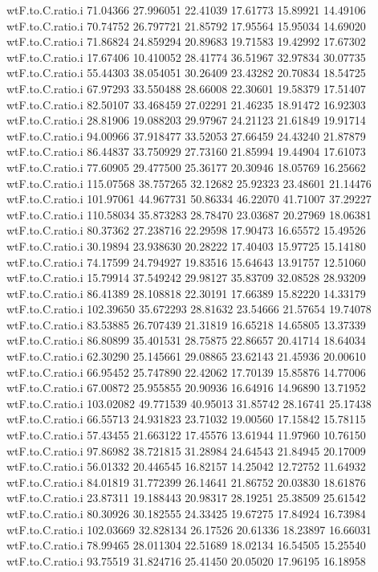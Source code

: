 \documentclass[11pt]{article} %
\begin{document}
\begin{Schunk}
\begin{Soutput}
wtF.to.C.ratio.i  71.04366 27.996051 22.41039 17.61773 15.89921 14.49106
wtF.to.C.ratio.i  70.74752 26.797721 21.85792 17.95564 15.95034 14.69020
wtF.to.C.ratio.i  71.86824 24.859294 20.89683 19.71583 19.42992 17.67302
wtF.to.C.ratio.i  17.67406 10.410052 28.41774 36.51967 32.97834 30.07735
wtF.to.C.ratio.i  55.44303 38.054051 30.26409 23.43282 20.70834 18.54725
wtF.to.C.ratio.i  67.97293 33.550488 28.66008 22.30601 19.58379 17.51407
wtF.to.C.ratio.i  82.50107 33.468459 27.02291 21.46235 18.91472 16.92303
wtF.to.C.ratio.i  28.81906 19.088203 29.97967 24.21123 21.61849 19.91714
wtF.to.C.ratio.i  94.00966 37.918477 33.52053 27.66459 24.43240 21.87879
wtF.to.C.ratio.i  86.44837 33.750929 27.73160 21.85994 19.44904 17.61073
wtF.to.C.ratio.i  77.60905 29.477500 25.36177 20.30946 18.05769 16.25662
wtF.to.C.ratio.i 115.07568 38.757265 32.12682 25.92323 23.48601 21.14476
wtF.to.C.ratio.i 101.97061 44.967731 50.86334 46.22070 41.71007 37.29227
wtF.to.C.ratio.i 110.58034 35.873283 28.78470 23.03687 20.27969 18.06381
wtF.to.C.ratio.i  80.37362 27.238716 22.29598 17.90473 16.65572 15.49526
wtF.to.C.ratio.i  30.19894 23.938630 20.28222 17.40403 15.97725 15.14180
wtF.to.C.ratio.i  74.17599 24.794927 19.83516 15.64643 13.91757 12.51060
wtF.to.C.ratio.i  15.79914 37.549242 29.98127 35.83709 32.08528 28.93209
wtF.to.C.ratio.i  86.41389 28.108818 22.30191 17.66389 15.82220 14.33179
wtF.to.C.ratio.i 102.39650 35.672293 28.81632 23.54666 21.57654 19.74078
wtF.to.C.ratio.i  83.53885 26.707439 21.31819 16.65218 14.65805 13.37339
wtF.to.C.ratio.i  86.80899 35.401531 28.75875 22.86657 20.41714 18.64034
wtF.to.C.ratio.i  62.30290 25.145661 29.08865 23.62143 21.45936 20.00610
wtF.to.C.ratio.i  66.95452 25.747890 22.42062 17.70139 15.85876 14.77006
wtF.to.C.ratio.i  67.00872 25.955855 20.90936 16.64916 14.96890 13.71952
wtF.to.C.ratio.i 103.02082 49.771539 40.95013 31.85742 28.16741 25.17438
wtF.to.C.ratio.i  66.55713 24.931823 23.71032 19.00560 17.15842 15.78115
wtF.to.C.ratio.i  57.43455 21.663122 17.45576 13.61944 11.97960 10.76150
wtF.to.C.ratio.i  97.86982 38.721815 31.28984 24.64543 21.84945 20.17009
wtF.to.C.ratio.i  56.01332 20.446545 16.82157 14.25042 12.72752 11.64932
wtF.to.C.ratio.i  84.01819 31.772399 26.14641 21.86752 20.03830 18.61876
wtF.to.C.ratio.i  23.87311 19.188443 20.98317 28.19251 25.38509 25.61542
wtF.to.C.ratio.i  80.30926 30.182555 24.33425 19.67275 17.84924 16.73984
wtF.to.C.ratio.i 102.03669 32.828134 26.17526 20.61336 18.23897 16.66031
wtF.to.C.ratio.i  78.99465 28.011304 22.51689 18.02134 16.54505 15.25540
wtF.to.C.ratio.i  93.75519 31.824716 25.41450 20.05020 17.96195 16.18958

\end{Soutput}
\end{Schunk}
\end{document}
